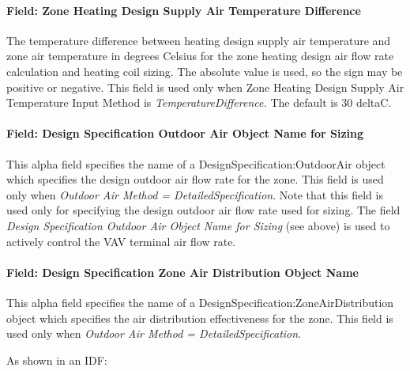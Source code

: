 \paragraph{Field: Zone Heating Design Supply Air Temperature Difference}\label{field-zone-heating-design-supply-air-temperature-difference-6}

The temperature difference between heating design supply air temperature and zone air temperature in degrees Celsius for the zone heating design air flow rate calculation and heating coil sizing. The absolute value is used, so the sign may be positive or negative. This field is used only when Zone Heating Design Supply Air Temperature Input Method is \emph{TemperatureDifference.} The default is 30 deltaC.

\paragraph{Field: Design Specification Outdoor Air Object Name for Sizing}\label{field-design-specification-outdoor-air-object-name-for-sizing}

This alpha field specifies the name of a DesignSpecification:OutdoorAir object which specifies the design outdoor air flow rate for the zone. This field is used only when \emph{Outdoor Air Method = DetailedSpecification}. Note that this field is used only for specifying the design outdoor air flow rate used for sizing. The field \emph{Design Specification Outdoor Air Object Name for Sizing} (see above) is used to actively control the VAV terminal air flow rate.

\paragraph{Field: Design Specification Zone Air Distribution Object Name}\label{field-design-specification-zone-air-distribution-object-name-7}

This alpha field specifies the name of a DesignSpecification:ZoneAirDistribution object which specifies the air distribution effectiveness for the zone. This field is used only when \emph{Outdoor Air Method = DetailedSpecification}.

As shown in an IDF:

